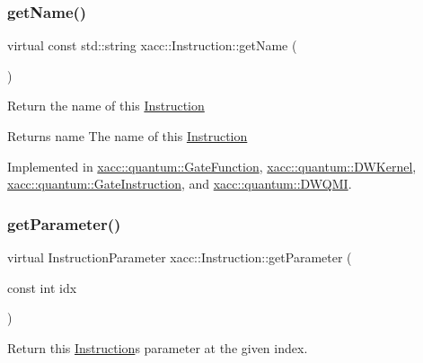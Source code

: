 \mbox{\label{a01155_ac7ff23f693e2276edbf3fdac5452792c}} 
\subsubsection{\texorpdfstring{get\+Name()}{getName()}}
{\footnotesize\ttfamily virtual const std\+::string xacc\+::\+Instruction\+::get\+Name (\begin{DoxyParamCaption}{ }\end{DoxyParamCaption})\hspace{0.3cm}{\ttfamily [pure virtual]}}

Return the name of this \hyperlink{a01155}{Instruction}

\begin{DoxyReturn}{Returns}
name The name of this \hyperlink{a01155}{Instruction} 
\end{DoxyReturn}


Implemented in \hyperlink{a01011_af42efb6191267164717d53c469e15d3a}{xacc\+::quantum\+::\+Gate\+Function}, \hyperlink{a00983_a7f0c4d3c73029566561cf56a474bcbbd}{xacc\+::quantum\+::\+D\+W\+Kernel}, \hyperlink{a01015_a0db03b9e46eeba1134f0ca2b83ccc842}{xacc\+::quantum\+::\+Gate\+Instruction}, and \hyperlink{a00987_ad93428eb61adade7bb99c7633bb02aca}{xacc\+::quantum\+::\+D\+W\+Q\+MI}.

\mbox{\label{a01155_aa0d9de97a4833a042379647f83c33ab6}} 
\subsubsection{\texorpdfstring{get\+Parameter()}{getParameter()}}
{\footnotesize\ttfamily virtual Instruction\+Parameter xacc\+::\+Instruction\+::get\+Parameter (\begin{DoxyParamCaption}\item[{const int}]{idx }\end{DoxyParamCaption})\hspace{0.3cm}{\ttfamily [pure virtual]}}

Return this \hyperlink{a01155}{Instruction}\textquotesingle{}s parameter at the given index.


